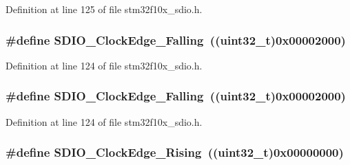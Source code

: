 Definition at line 125 of file stm32f10x\+\_\+sdio.\+h.

\subsubsection[{\texorpdfstring{S\+D\+I\+O\+\_\+\+Clock\+Edge\+\_\+\+Falling}{SDIO_ClockEdge_Falling}}]{\setlength{\rightskip}{0pt plus 5cm}\#define S\+D\+I\+O\+\_\+\+Clock\+Edge\+\_\+\+Falling~(({\bf uint32\+\_\+t})0x00002000)}\hypertarget{group___s_d_i_o___clock___edge_ga7be68024e3e2fe1994def85bc944189b}{}\label{group___s_d_i_o___clock___edge_ga7be68024e3e2fe1994def85bc944189b}


Definition at line 124 of file stm32f10x\+\_\+sdio.\+h.

\subsubsection[{\texorpdfstring{S\+D\+I\+O\+\_\+\+Clock\+Edge\+\_\+\+Falling}{SDIO_ClockEdge_Falling}}]{\setlength{\rightskip}{0pt plus 5cm}\#define S\+D\+I\+O\+\_\+\+Clock\+Edge\+\_\+\+Falling~(({\bf uint32\+\_\+t})0x00002000)}\hypertarget{group___s_d_i_o___clock___edge_ga7be68024e3e2fe1994def85bc944189b}{}\label{group___s_d_i_o___clock___edge_ga7be68024e3e2fe1994def85bc944189b}


Definition at line 124 of file stm32f10x\+\_\+sdio.\+h.

\subsubsection[{\texorpdfstring{S\+D\+I\+O\+\_\+\+Clock\+Edge\+\_\+\+Rising}{SDIO_ClockEdge_Rising}}]{\setlength{\rightskip}{0pt plus 5cm}\#define S\+D\+I\+O\+\_\+\+Clock\+Edge\+\_\+\+Rising~(({\bf uint32\+\_\+t})0x00000000)}\hypertarget{group___s_d_i_o___clock___edge_ga6d0f902037762a3048d95303c0037313}{}\label{group___s_d_i_o___clock___edge_ga6d0f902037762a3048d95303c0037313}


